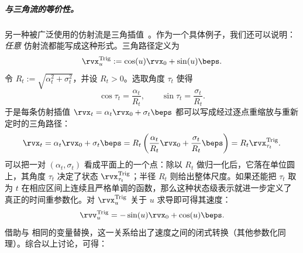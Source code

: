 \subparagraph{与三角流的等价性。}
另一种被广泛使用的仿射流是三角插值~\citep{salimans2021progressive,albergo2023stochastic,lu2024simplifying}。作为一个具体例子，我们还可以说明：\emph{任意} 仿射流都能写成这种形式。三角路径定义为
\begin{align}\label{eq:trig-para}
\rvx^{\mathrm{Trig}}_u := \cos(u) \rvx_0 + \sin(u)\beps .
\end{align}
令 $R_t := \sqrt{\alpha_t^2 + \sigma_t^2}$，并设 $R_t>0$。选取角度 $\tau_t$ 使得
\[
\cos \tau_t = \frac{\alpha_t}{R_t},
\qquad
\sin \tau_t = \frac{\sigma_t}{R_t}.
\]
于是每条仿射插值 $\rvx_t=\alpha_t\rvx_0+\sigma_t\beps$ 都可以写成经过逐点重缩放与重新定时的三角路径：
\begin{align}\label{eq:any-to-trig}
\rvx_t
= \alpha_t\rvx_0+\sigma_t\beps
= R_t \left(\frac{\alpha_t}{R_t}\rvx_0+\frac{\sigma_t}{R_t}\beps\right)
= R_t \rvx^{\mathrm{Trig}}_{\tau_t}.
\end{align}
可以把一对 $(\alpha_t,\sigma_t)$ 看成平面上的一个点：除以 $R_t$ 做归一化后，它落在单位圆上，其角度 $\tau_t$ 决定了状态 $\rvx^{\mathrm{Trig}}_{\tau_t}$；半径 $R_t$ 则给出整体尺度。如果还能把 $\tau_t$ 取为 $t$ 在相应区间上连续且严格单调的函数，那么这种状态级表示就进一步定义了真正的时间重参数化。对 $\rvx^{\mathrm{Trig}}_u$ 关于 $u$ 求导即可得其速度：
\[
\rvv^{\mathrm{Trig}}_u = -\sin(u) \rvx_0 + \cos(u) \beps.
\]
借助与  相同的变量替换，这一关系给出了速度之间的闭式转换（其他参数化同理）。综合以上讨论，可得：



